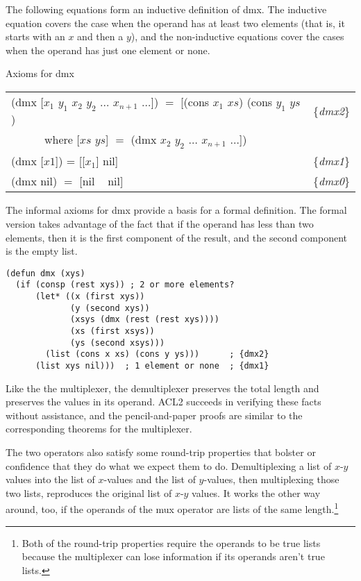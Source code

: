 The following equations form an inductive definition of dmx.
The inductive equation covers the case when
the operand has at least two elements
(that is, it starts with an $x$ and then a $y$),
and the non-inductive equations cover the cases
when the operand has just one element or none.

\begin{center}
Axioms for dmx
\begin{tabular}{ll}
(dmx [$x_1$ $y_1$ $x_2$ $y_2$ $\dots$ $x_{n+1}$ $\dots$]) $=$ [(cons $x_1$ $xs$) (cons $y_1$ $ys$) &\{\emph{dmx2}\} \\
~~~~~~where [$xs$ $ys$] $=$ (dmx $x_2$ $y_2$ $\dots$ $x_{n+1}$ $\dots$])                           &\\
(dmx [$x1$]) =  [[$x_1$] nil]                                                                      &\{\emph{dmx1}\} \\
(dmx nil) $=$ [nil ~ nil]                                                                          &\{\emph{dmx0}\} \\
\end{tabular}
\end{center}

The informal axioms for dmx provide a basis for a formal definition.
The formal version takes advantage of the fact that if the operand
has less than two elements, then it is the first component of the result,
and the second component is the empty list.

\label{dmx-defun}
\begin{Verbatim}
(defun dmx (xys)
  (if (consp (rest xys)) ; 2 or more elements?
      (let* ((x (first xys))
             (y (second xys))
             (xsys (dmx (rest (rest xys))))
             (xs (first xsys))
             (ys (second xsys)))
        (list (cons x xs) (cons y ys)))      ; {dmx2}
      (list xys nil)))  ; 1 element or none  ; {dmx1}
\end{Verbatim}

Like the the multiplexer,
the demultiplexer preserves the total length
and preserves the values in its operand.
ACL2 succeeds in verifying these facts without assistance,
and the pencil-and-paper proofs are similar to the corresponding
theorems for the multiplexer.

The two operators also satisfy some round-trip properties
that bolster or confidence that they do what we expect them to do.
Demultiplexing a list of $x$-$y$ values into the list of
$x$-values and the list of $y$-values, then multiplexing
those two lists, reproduces the original list of $x$-$y$ values.
It works the other way around, too, if the operands of
the mux operator are lists of the same length.\footnote{Both
of the round-trip properties require the operands to be
true lists because the multiplexer can lose information
if its operands aren't true lists.}

